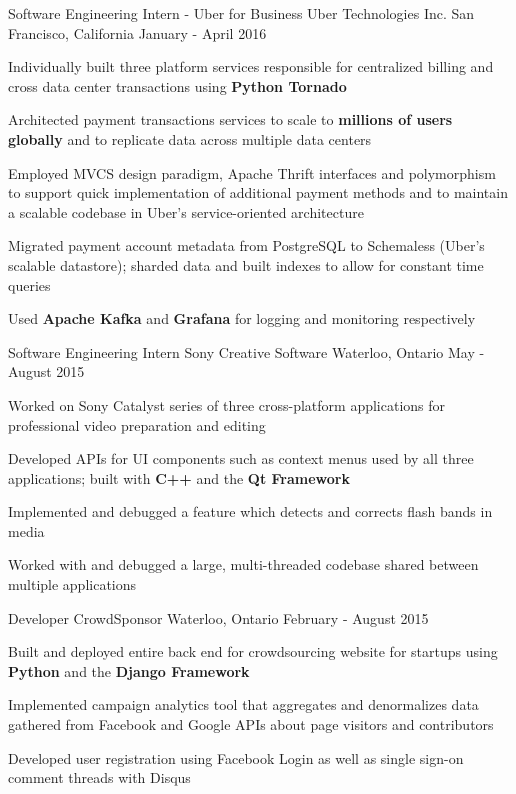 \begin{cventries}
  \cventry
    {Software Engineering Intern - Uber for Business}
    {Uber Technologies Inc.}
    {San Francisco, California}
    {January - April 2016}
    {
      \begin{cvitems}
      \item Individually built three platform services responsible for centralized billing and cross data center transactions using \textbf{Python Tornado}
      \item Architected payment transactions services to scale to \textbf{millions of users globally} and to replicate data across multiple data centers
      \item Employed MVCS design paradigm, Apache Thrift interfaces and polymorphism to support quick implementation of additional payment methods and to maintain a scalable codebase in Uber's service-oriented architecture
      \item Migrated payment account metadata from PostgreSQL to Schemaless (Uber's scalable datastore); sharded data and built indexes to allow for constant time queries
      \item Used \textbf{Apache Kafka} and \textbf{Grafana} for logging and monitoring respectively
      \end{cvitems}
    }
  \cventry
    {Software Engineering Intern}
    {Sony Creative Software}
    {Waterloo, Ontario}
    {May - August 2015}
    {
      \begin{cvitems}
        \item Worked on Sony Catalyst series of three cross-platform applications for professional video preparation and editing
        \item Developed APIs for UI components such as context menus used by all three applications; built with \textbf{C++} and the \textbf{Qt Framework}
        \item Implemented and debugged a feature which detects and corrects flash bands in media
        \item Worked with and debugged a large, multi-threaded codebase shared between multiple applications
      \end{cvitems}
    }
  \cventry
    {Developer}
    {CrowdSponsor}
    {Waterloo, Ontario}
    {February - August 2015}
    {
      \begin{cvitems}
      \item Built and deployed entire back end for crowdsourcing website for startups using \textbf{Python} and the \textbf{Django Framework}
        \item Implemented campaign analytics tool that aggregates and denormalizes data gathered from Facebook and Google APIs about page visitors and contributors
        \item Developed user registration using Facebook Login as well as single sign-on comment threads with Disqus
      \end{cvitems}
    }
\end{cventries}
